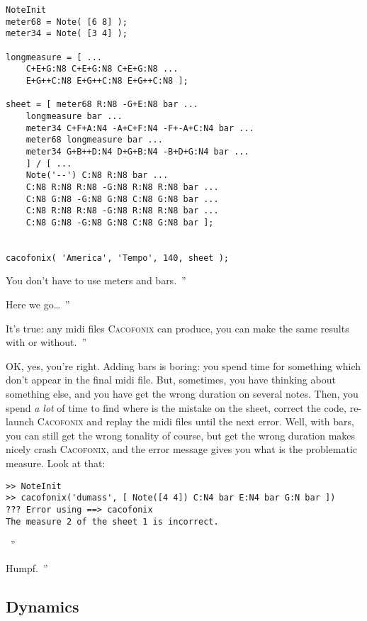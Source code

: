 \documentclass{article}
\newcommand{\cacofonix}{\textsc{Cacofonix}\xspace}
\newenvironment{meenv}{ \par \noindent \makebox[6em][r]{ \textcolor{mecolor}{Me}: `` --~}}{~''}
\newenvironment{myselfenv}{ \par \noindent \makebox[6em][r]{ \textcolor{myselfcolor}{Myself}: `` --~}}{~''}
\newcommand{\me}[1]{\begin{meenv}#1\end{meenv}}
\newcommand{\myself}[1]{\begin{myselfenv}#1\end{myselfenv}}
\begin{document}

\begin{lstlisting}
NoteInit
meter68 = Note( [6 8] );
meter34 = Note( [3 4] );

longmeasure = [ ...
	C+E+G:N8 C+E+G:N8 C+E+G:N8 ...
	E+G++C:N8 E+G++C:N8 E+G++C:N8 ];

sheet = [ meter68 R:N8 -G+E:N8 bar ...
	longmeasure bar ...
	meter34 C+F+A:N4 -A+C+F:N4 -F+-A+C:N4 bar ...
	meter68 longmeasure bar ...
	meter34 G+B++D:N4 D+G+B:N4 -B+D+G:N4 bar ...
	] / [ ...
	Note('--') C:N8 R:N8 bar ...
	C:N8 R:N8 R:N8 -G:N8 R:N8 R:N8 bar ...
	C:N8 G:N8 -G:N8 G:N8 C:N8 G:N8 bar ...
	C:N8 R:N8 R:N8 -G:N8 R:N8 R:N8 bar ...
	C:N8 G:N8 -G:N8 G:N8 C:N8 G:N8 bar ];
	

cacofonix( 'America', 'Tempo', 140, sheet );
\end{lstlisting}

\me{You don't have to use meters and bars.}
\myself{Here we go\dots}
\me{It's true: any midi files \cacofonix can produce, you can make the same results with or without.}
\begin{myselfenv}%
	OK, yes, you're right. Adding bars is boring: you spend time for something which don't appear in the final midi file. But, sometimes, you have thinking about something else, and you have get the wrong duration on several notes. Then, you spend \emph{a lot} of time to find where is the mistake on the sheet, correct the code, re-launch \cacofonix and replay the midi files until the next error. Well, with bars, you can still get the wrong tonality of course, but get the wrong duration makes nicely crash \cacofonix, and the error message gives you what is the problematic measure. Look at that:
\begin{lstlisting}
>> NoteInit
>> cacofonix('dumass', [ Note([4 4]) C:N4 bar E:N4 bar G:N bar ])
??? Error using ==> cacofonix
The measure 2 of the sheet 1 is incorrect.
\end{lstlisting}%
\end{myselfenv}
\me{Humpf.}

\subsection{Dynamics}
\label{sec:Dynamics}
\end{document}
